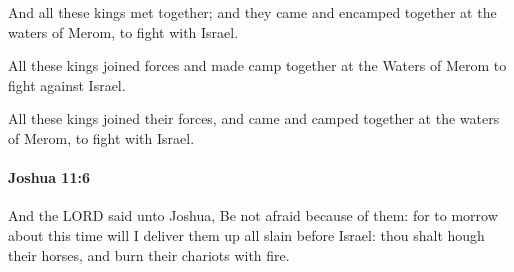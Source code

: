 			\begin{versebox}
					\item[BHS] 
					\item[ASV] And all these kings met together; and they came and encamped together at the waters of Merom, to fight with Israel.
					\item[NIV] All these kings joined forces and made camp together at the Waters of Merom to fight against Israel.
					\item[NRSV] All these kings joined their forces, and came and camped together at the waters of Merom, to fight with Israel.
			\end{versebox}

		\paragraph{Joshua 11:6} %
			\label{JOSHUA-11-6}

			And the LORD said unto Joshua, Be not afraid because of them: for to morrow about this time will I deliver them up all slain before Israel: thou shalt hough their horses, and burn their chariots with fire.

